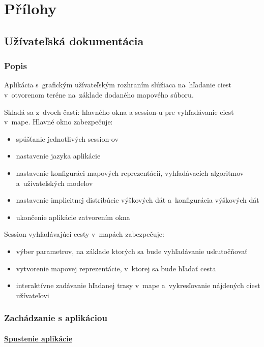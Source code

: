 \documentclass[12pt,a4paper]{report}
\begin{document}
\chapter{Přílohy}

\section{Užívateľská dokumentácia}\label{uzivatelska_dokumentacia}

\subsection{Popis}

Aplikácia s~grafickým užívateľským rozhraním slúžiaca na~hľadanie ciest v~otvorenom teréne na~základe dodaného mapového súboru.

Skladá sa z~dvoch častí: hlavného okna a session-u pre vyhľadávanie ciest v~mape. Hlavné okno zabezpečuje:
\begin{itemize}
    \item spúšťanie jednotlivých session-ov
    \item nastavenie jazyka aplikácie
    \item nastavenie konfiguráci mapových reprezentácií, vyhľadávacích algoritmov a~užívateľských modelov
    \item nastavenie implicitnej distribúcie výškových dát a~konfigurácia výškových dát
    \item ukončenie aplikácie zatvorením okna
\end{itemize}
Session vyhľadávajúci cesty v~mapách zabezpečuje:
\begin{itemize}
    \item výber parametrov, na základe ktorých sa bude vyhľadávanie uskutočňovať
    \item vytvorenie mapovej reprezentácie, v~ktorej sa bude hľadať cesta
    \item interaktívne zadávanie hľadanej trasy v~mape a~vykresľovanie nájdených ciest užívateľovi
\end{itemize}

\subsection{Zachádzanie s aplikáciou}

\subsubsection{\underline{Spustenie aplikácie}}
\end{document}
